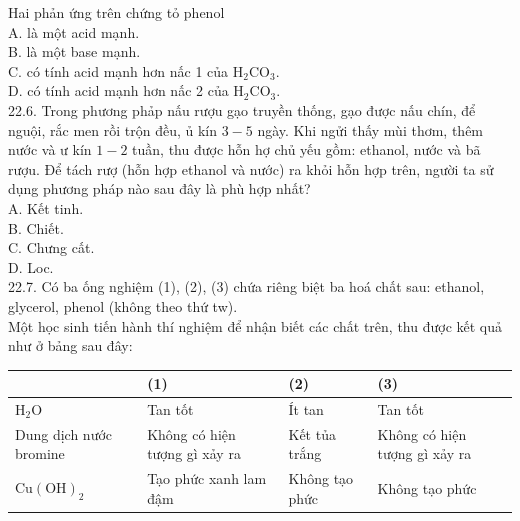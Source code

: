\documentclass[10pt]{article}
\begin{document}
Hai phản ứng trên chứng tỏ phenol\\
A. là một acid mạnh.\\
B. là một base mạnh.\\
C. có tính acid mạnh hơn nấc 1 của $\mathrm{H}_{2} \mathrm{CO}_{3}$.\\
D. có tính acid mạnh hơn nấc 2 của $\mathrm{H}_{2} \mathrm{CO}_{3}$.\\
22.6. Trong phương phảp nấu rượu gạo truyền thống, gạo được nấu chín, để nguội, rắc men rồi trộn đều, ủ kín $3-5$ ngày. Khi ngửi thấy mùi thơm, thêm nước và ư kín $1-2$ tuần, thu được hỗn hợ chủ yếu gồm: ethanol, nước và bã rượu. Để tách rượ (hỗn hợp ethanol và nước) ra khỏi hỗn hợp trên, người ta sử dụng phương pháp nào sau đây là phù hợp nhất?\\
A. Kết tinh.\\
B. Chiết.\\
C. Chưng cất.\\
D. Loc.\\
22.7. Có ba ống nghiệm (1), (2), (3) chứa riêng biệt ba hoá chất sau: ethanol, glycerol, phenol (không theo thứ tw).\\
Một học sinh tiến hành thí nghiệm để nhận biết các chất trên, thu được kết quả như ở bảng sau đây:

\begin{center}
\begin{tabular}{|l|l|l|l|}
\hline
 & (1) & (2) & (3) \\
\hline
$\mathrm{H}_{2} \mathrm{O}$ & Tan tốt & Ít tan & Tan tốt \\
\hline
Dung dịch nước bromine & Không có hiện tượng gì xảy ra & Kết tủa trắng & Không có hiện tượng gì xảy ra \\
\hline
$\mathrm{Cu}(\mathrm{OH})_{2}$ & Tạo phức xanh lam đậm & Không tạo phức & Không tạo phức \\
\hline
\end{tabular}
\end{center}
\end{document}
